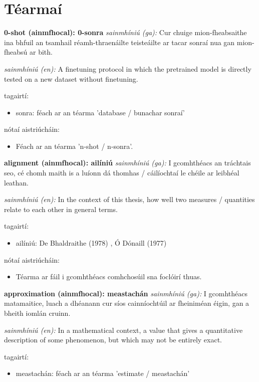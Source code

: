 \documentclass{article}
\begin{document}
\section{Téarmaí}
\textbf{0-shot (ainmfhocal): 0-sonra}
\textit{sainmhíniú (ga):} Cur chuige mion-fheabsaithe ina bhfuil an tsamhail réamh-thraenáilte teisteáilte ar tacar sonraí nua gan mion-fheabsú ar bith.

\textit{sainmhíniú (en):} A finetuning protocol in which the pretrained model is directly tested on a new dataset without finetuning.

tagairtí:
\begin{itemize}
	\item sonra: féach ar an téarma 'database / bunachar sonraí'
\end{itemize}

nótaí aistriúcháin:
\begin{itemize}
	\item Féach ar an téarma 'n-shot / n-sonra'.
\end{itemize}


\textbf{alignment (ainmfhocal): ailíniú}
\textit{sainmhíniú (ga):} I gcomhthéacs an tráchtais seo, cé chomh maith is a luíonn dá thomhas / cáilíochtaí le chéile ar leibhéal leathan.

\textit{sainmhíniú (en):} In the context of this thesis, how well two measures / quantities relate to each other in general terms.

tagairtí:
\begin{itemize}
	\item ailíniú: De Bhaldraithe (1978) \cite{de-bhaldraithe}, Ó Dónaill (1977) \cite{odonaill}
\end{itemize}

nótaí aistriúcháin:
\begin{itemize}
	\item Téarma ar fáil i gcomhthéacs comhchosúil sna foclóirí thuas.
\end{itemize}


\textbf{approximation (ainmfhocal): meastachán}
\textit{sainmhíniú (ga):} I gcomhthéacs matamaitice, luach a dhéanann cur síos cainníochtúil ar fheiniméan éigin, gan a bheith iomlán cruinn.

\textit{sainmhíniú (en):} In a mathematical context, a value that gives a quantitative description of some phenomenon, but which may not be entirely exact.

tagairtí:
\begin{itemize}
	\item meastachán: féach ar an téarma 'estimate / meastachán'
\end{itemize}
\end{document}
